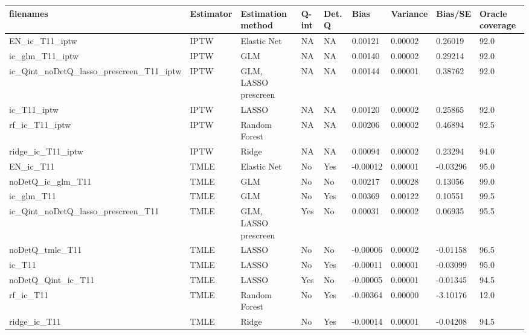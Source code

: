 
\begin{longtable}[l]{lllllllll}
\toprule
filenames & Estimator & Estimation method & Q-int & Det. Q & Bias & Variance & Bias/SE & Oracle coverage\\
\midrule
EN\_ic\_T11\_iptw & IPTW & Elastic Net & NA & NA & 0.00121 & 0.00002 & 0.26019 & 92.0\\
ic\_glm\_T11\_iptw & IPTW & GLM & NA & NA & 0.00140 & 0.00002 & 0.29214 & 92.0\\
ic\_Qint\_noDetQ\_lasso\_prescreen\_T11\_iptw & IPTW & GLM, LASSO prescreen & NA & NA & 0.00144 & 0.00001 & 0.38762 & 92.0\\
ic\_T11\_iptw & IPTW & LASSO & NA & NA & 0.00120 & 0.00002 & 0.25865 & 92.0\\
rf\_ic\_T11\_iptw & IPTW & Random Forest & NA & NA & 0.00206 & 0.00002 & 0.46894 & 92.5\\
ridge\_ic\_T11\_iptw & IPTW & Ridge & NA & NA & 0.00094 & 0.00002 & 0.23294 & 94.0\\
EN\_ic\_T11 & TMLE & Elastic Net & No & Yes & -0.00012 & 0.00001 & -0.03296 & 95.0\\
noDetQ\_ic\_glm\_T11 & TMLE & GLM & No & No & 0.00217 & 0.00028 & 0.13056 & 99.0\\
ic\_glm\_T11 & TMLE & GLM & No & Yes & 0.00369 & 0.00122 & 0.10551 & 99.5\\
ic\_Qint\_noDetQ\_lasso\_prescreen\_T11 & TMLE & GLM, LASSO prescreen & Yes & No & 0.00031 & 0.00002 & 0.06935 & 95.5\\
noDetQ\_tmle\_T11 & TMLE & LASSO & No & No & -0.00006 & 0.00002 & -0.01158 & 96.5\\
ic\_T11 & TMLE & LASSO & No & Yes & -0.00011 & 0.00001 & -0.03099 & 95.0\\
noDetQ\_Qint\_ic\_T11 & TMLE & LASSO & Yes & No & -0.00005 & 0.00001 & -0.01345 & 94.5\\
rf\_ic\_T11 & TMLE & Random Forest & No & Yes & -0.00364 & 0.00000 & -3.10176 & 12.0\\
ridge\_ic\_T11 & TMLE & Ridge & No & Yes & -0.00014 & 0.00001 & -0.04208 & 94.5\\
\bottomrule
\end{longtable}
